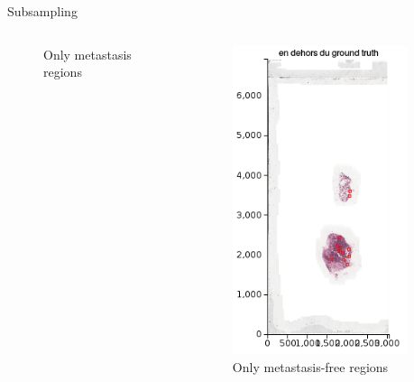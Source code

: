 \documentclass{beamer}
\begin{document}
\begin{frame}[noframenumbering]{Subsampling}
\begin{columns}[T]
\begin{column}{.25\textwidth}
\begin{figure}[!ht]
\caption{Only metastasis regions}
\label{}
\end{figure}
\end{column}%
\begin{column}{.25\textwidth}
\begin{figure}[!ht]
\centering
\includegraphics[width=\textwidth]{OnlyNormal.png}
\caption{Only metastasis-free regions}
\label{}
\end{figure}
\end{column}%
\begin{column}{.25\textwidth}

\end{column}
\end{columns}
\end{frame}
\end{document}
